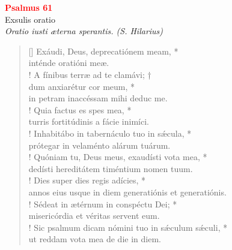 \vspace{0.3cm}
\begin{center}
 \textcolor{red}{\large \bf Psalmus 61}\\
Exsulis oratio\\
\textit{\small Oratio iusti æterna sperantis. (S. Hilarius)}
\end{center}
\begin{verse}[\versewidth]
Exáudi, Deus, deprecatiónem meam, *\\
inténde oratióni meæ.\\!
\vin A fínibus terræ ad te clamávi; †\\
\vin dum anxiarétur cor meum, *\\
\vin in petram inaccéssam mihi deduc me.\\!
Quia factus es spes mea, *\\
turris fortitúdinis a fácie inimíci.\\!
\vin Inhabitábo in tabernáculo tuo in s\'{æ}cula, *\\
\vin prótegar in velaménto alárum tuárum.\\!
Quóniam tu, Deus meus, exaudísti vota mea, *\\
dedísti hereditátem timéntium nomen tuum.\\!
\vin Dies super dies regis adícies, *\\
\vin annos eius usque in diem generatiónis et generatiónis.\\!
Sédeat in ætérnum in conspéctu Dei; *\\
misericórdia et véritas servent eum.\\!
\vin Sic psalmum dicam nómini tuo in s\'{æ}culum s\'{æ}culi, *\\
\vin ut reddam vota mea de die in diem.\\
\end{verse}
\vspace{1cm}


\gresetfirstlineaboveinitial{\small \textcolor{red}{ Ps. 28}}{}
\setaboveinitialseparation{0.92mm}




\def\greinitialformat#1{{\fontsize{40}{40}\selectfont #1}}
\gresetfirstlineaboveinitial{\small \textcolor{red}{ Ps. 48}}{}
\setaboveinitialseparation{0.72mm}

